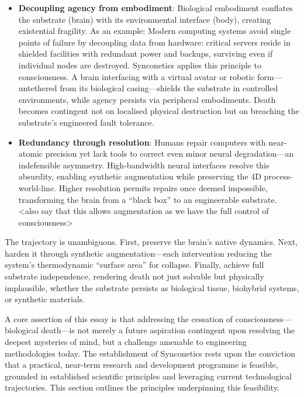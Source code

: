 \documentclass[10pt]{article}
\begin{document}
\begin{sloppypar}
  \begin{itemize}
    \item \textbf{Decoupling agency from embodiment}: Biological embodiment conflates the substrate (brain) with its environmental interface (body), creating existential fragility. As an example: Modern computing systems avoid single points of failure by decoupling data from hardware: critical servers reside in shielded facilities with redundant power and backups, surviving even if individual nodes are destroyed. Synconetics applies this principle to consciousness. A brain interfacing with a virtual avatar or robotic form—untethered from its biological casing—shields the substrate in controlled environments, while agency persists via peripheral embodiments. Death becomes contingent not on localised physical destruction but on breaching the substrate’s engineered fault tolerance.
    \item \textbf{Redundancy through resolution}: Humans repair computers with near-atomic precision yet lack tools to correct even minor neural degradation—an indefensible asymmetry. High-bandwidth neural interfaces resolve this absurdity, enabling synthetic augmentation while preserving the 4D process-world-line. Higher resolution permits repairs once deemed impossible, transforming the brain from a “black box” to an engineerable substrate. <also say that this allows augmentation as we have the full control of consciousness>
  \end{itemize}

  The trajectory is unambiguous. First, preserve the brain’s native dynamics. Next, harden it through synthetic augmentation—each intervention reducing the system’s thermodynamic “surface area” for collapse. Finally, achieve full substrate independence, rendering death not just solvable but physically implausible, whether the substrate persists as biological tissue, biohybrid systems, or synthetic materials.

  A core assertion of this essay is that addressing the cessation of consciousness—biological death—is not merely a future aspiration contingent upon resolving the deepest mysteries of mind, but a challenge amenable to engineering methodologies today. The establishment of Synconetics rests upon the conviction that a practical, near-term research and development programme is feasible, grounded in established scientific principles and leveraging current technological trajectories. This section outlines the principles underpinning this feasibility.


\end{sloppypar}
\end{document}

